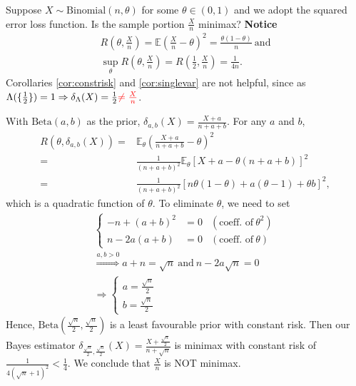 \begin{example}
    Suppose $X\sim\text{Binomial}(n,\theta)$ for some $\theta\in(0,1)$ and 
    we adopt the squared error loss function. Is the sample portion $\frac{X}{n}$ minimax?
    \textbf{Notice}
    \begin{gather}
        R(\theta,\frac{X}{n})=\mathbb{E}\left(\frac{X}{n}-\theta\right)^2=\frac{\theta(1-\theta)}{n}~\text{and}\\
        \sup_\theta{R(\theta,\frac{X}{n})}=R(\frac{1}{2},\frac{X}{n})=\frac{1}{4n}.
    \end{gather}
    Corollaries \ref{cor:constrisk} and \ref{cor:singlevar} are not helpful,
    since as $\Lambda(\{\frac{1}{2}\})=1
    \Rightarrow
    \delta_\Lambda(X)=\frac{1}{2}{\color{red}\neq\frac{X}{n}}$.

    With $\text{Beta}(a,b)$ as the prior,
    $\delta_{a,b}(X)=\frac{X+a}{n+a+b}$.
    For any $a$ and $b$,
    \begin{align}
        R(\theta,\delta_{a,b}(X))
        =& \mathbb{E}_\theta\left(\frac{X+a}{n+a+b}-\theta\right)^2\\
        =& \frac{1}{(n+a+b)^2}\mathbb{E}_\theta[X+a-\theta(n+a+b)]^2\\
        =& \frac{1}{(n+a+b)^2}[n\theta(1-\theta)+a(\theta-1)+\theta{b}]^2,
    \end{align}
    which is a quadratic function of $\theta$. 
    To eliminate $\theta$,
    we need to set 
    \begin{gather}
        \left\{\begin{array}{rll}
            -n+(a+b)^2 &=0 & (\text{coeff. of}~\theta^2) \\
            n-2a(a+b) &=0 & (\text{coeff. of}~\theta)
        \end{array}\right.\\
    \overset{a,b>0}{\Longrightarrow} a+n=\sqrt{n}~\text{and}~n-2a\sqrt{n}=0\\
    \Rightarrow \left\{\begin{array}{l}
        a=\frac{\sqrt{n}}{2} \\
        b=\frac{\sqrt{n}}{2}
    \end{array}\right.
    \end{gather}
    Hence, $\text{Beta}(\frac{\sqrt{n}}{2},\frac{\sqrt{n}}{2})$
    is a least favourable prior with constant risk.
    Then our Bayes estimator 
    $\delta_{\frac{\sqrt{n}}{2},\frac{\sqrt{n}}{2}}(X)=\frac{X+\frac{\sqrt{n}}{2}}{n+\sqrt{n}}$
    is minimax with constant risk of $\frac{1}{4(\sqrt{n}+1)^2}<\frac{1}{4}$.
    We conclude that $\frac{X}{n}$ is NOT minimax.
\end{example}

